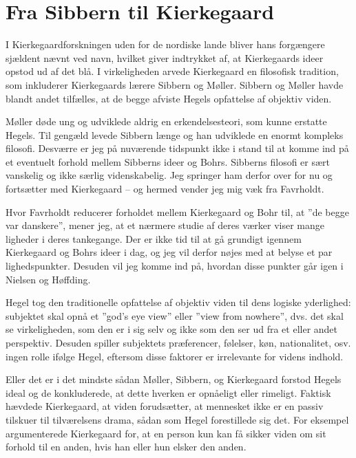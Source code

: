 \documentclass[12pt]{article}
\begin{document}
\hypertarget{fra-sibbern-til-kierkegaard}{%
\section{Fra Sibbern til
Kierkegaard}\label{fra-sibbern-til-kierkegaard}}

I Kierkegaardforskningen uden for de nordiske lande bliver hans
forgængere sjældent nævnt ved navn, hvilket giver indtrykket af, at
Kierkegaards ideer opstod ud af det blå. I virkeligheden arvede
Kierkegaard en filosofisk tradition, som inkluderer Kierkegaards lærere
Sibbern og Møller. Sibbern og Møller havde blandt andet tilfælles, at de
begge afviste Hegels opfattelse af objektiv viden.

Møller døde ung og udviklede aldrig en erkendelsesteori, som kunne
erstatte Hegels. Til gengæld levede Sibbern længe og han udviklede en
enormt kompleks filosofi. Desværre er jeg på nuværende tidspunkt ikke i
stand til at komme ind på et eventuelt forhold mellem Sibberns ideer og
Bohrs. Sibberns filosofi er sært vanskelig og ikke særlig videnskabelig.
Jeg springer ham derfor over for nu og fortsætter med Kierkegaard -- og
hermed vender jeg mig væk fra Favrholdt.

Hvor Favrholdt reducerer forholdet mellem Kierkegaard og Bohr til, at
''de begge var danskere'', mener jeg, at et nærmere studie af deres
værker viser mange ligheder i deres tankegange. Der er ikke tid til at
gå grundigt igennem Kierkegaard og Bohrs ideer i dag, og jeg vil derfor
nøjes med at belyse et par lighedspunkter. Desuden vil jeg komme ind på,
hvordan disse punkter går igen i Nielsen og Høffding.

Hegel tog den traditionelle opfattelse af objektiv viden til dens
logiske yderlighed: subjektet skal opnå et ''god's eye view'' eller
''view from nowhere'', dvs. det skal se virkeligheden, som den er i
sig selv og ikke som den ser ud fra et eller andet perspektiv. Desuden
spiller subjektets præferencer, følelser, køn, nationalitet,
osv. ingen rolle ifølge Hegel, eftersom disse faktorer er irrelevante
for videns indhold.

Eller det er i det mindste sådan Møller, Sibbern, og Kierkegaard forstod
Hegels ideal og de konkluderede, at dette hverken er opnåeligt eller
rimeligt. Faktisk hævdede Kierkegaard, at viden forudsætter, at
mennesket ikke er en passiv tilskuer til tilværelsens drama, sådan som
Hegel forestillede sig det. For eksempel argumenterede Kierkegaard for,
at en person kun kan få sikker viden om sit forhold til en anden, hvis
han eller hun elsker den anden.
\end{document}
